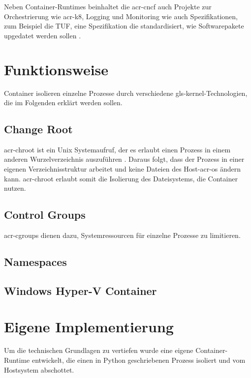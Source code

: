 Neben Container-Runtimes beinhaltet die \gls{acr-cncf} auch Projekte zur Orchestrierung wie \gls{acr-k8}, Logging und Monitoring wie auch Spezifikationen, zum Beispiel die TUF, eine Spezifikation die standardisiert, wie Softwarepakete upgedatet werden sollen \cite{CNCFCloudNativeInteractiveLandscape}. 

\section{Funktionsweise}
\label{sec:funktionsweise}

Container isolieren einzelne Prozesse durch verschiedene \gls{gls-kernel}-Technologien, die im Folgenden erklärt werden sollen.
\subsection{Change Root}
\label{sec:chroot}
\Gls{acr-chroot} ist ein Unix Systemaufruf, der es erlaubt einen Prozess in einem anderen Wurzelverzeichnis auszuführen \citep{Chroot1LinuxManualPage}. Daraus folgt, dass der Prozess in einer eigenen Verzeichnisstruktur arbeitet und keine Dateien des Host-\gls{acr-os} ändern kann. \Gls{acr-chroot} erlaubt somit die Isolierung des Dateisystems, die Container nutzen.

\subsection{Control Groups}
\label{sec:cgroups}
\glspl{acr-cgroup} dienen dazu, Systemressourcen für einzelne Prozesse zu limitieren. 

\subsection{Namespaces}
\label{sec:namespaces}

\subsection{Windows Hyper-V Container}
\label{sec:}


\section{Eigene Implementierung}
\label{sec:eigeneImpl}

Um die technischen Grundlagen zu vertiefen wurde eine eigene Container-Runtime entwickelt, die einen in Python geschriebenen Prozess isoliert und vom Hostsystem abschottet.